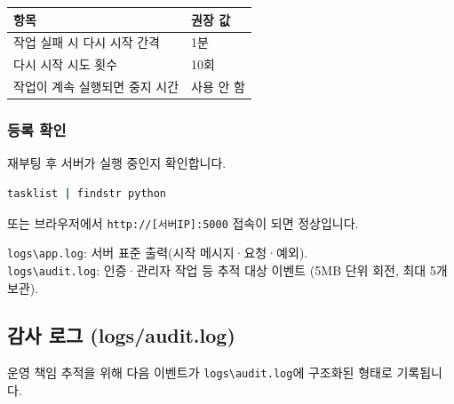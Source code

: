 \documentclass[a4paper,12pt]{article}
\begin{document}
\begin{center}
\begin{tabular}{ll}
\toprule
\textbf{항목} & \textbf{권장 값} \\
\midrule
작업 실패 시 다시 시작 간격 & 1분 \\
다시 시작 시도 횟수 & 10회 \\
작업이 계속 실행되면 중지 시간 & 사용 안 함 \\
\bottomrule
\end{tabular}
\end{center}

\subsubsection{등록 확인}

재부팅 후 서버가 실행 중인지 확인합니다.

\begin{lstlisting}[language=bash, caption=실행 확인]
tasklist | findstr python
\end{lstlisting}

또는 브라우저에서 \texttt{http://[서버IP]:5000} 접속이 되면 정상입니다.

\begin{tipbox}
  \texttt{logs\textbackslash app.log}: 서버 표준 출력(시작 메시지·요청·예외).\\
  \texttt{logs\textbackslash audit.log}: 인증·관리자 작업 등 추적 대상 이벤트
  (5MB 단위 회전, 최대 5개 보관).
\end{tipbox}

\subsection{감사 로그 (logs/audit.log)}

운영 책임 추적을 위해 다음 이벤트가 \texttt{logs\textbackslash audit.log}에
구조화된 형태로 기록됩니다.
\end{document}
